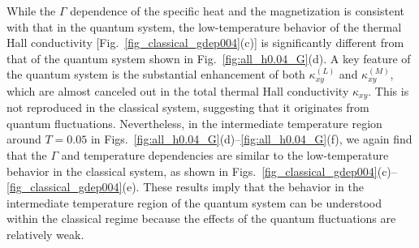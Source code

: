 \documentclass[twocolumn,superscriptaddress,showpacs, longbibliography, aps, prb]{revtex4-2}
\newcommand{\blue}[1]{\textcolor{blue}{#1}}
\newcommand{\orange}[1]{\textcolor{orange}{#1}}
\begin{document}
While the $\Gamma$ dependence of the specific heat and the magnetization is 
consistent with that in the quantum system,
the low-temperature behavior of the thermal Hall conductivity [Fig.~\ref{fig_classical_gdep004}(c)] is 
significantly different from that %
of the quantum system shown in Fig.~\ref{fig:all_h0.04_G}(d).
A key feature of %
the quantum system is the substantial enhancement of both $\kappa_{xy}^{(L)}$ and $\kappa_{xy}^{(M)}$, which are almost canceled out in the total thermal Hall conductivity $\kappa_{xy}$.
This is not reproduced in the classical system, suggesting that it %
originates from %
quantum fluctuations.
Nevertheless, in the intermediate temperature region around $T=0.05$ in Figs.~\ref{fig:all_h0.04_G}(d)--\ref{fig:all_h0.04_G}(f), 
we again find that the $\Gamma$ and temperature dependencies are similar to the low-temperature behavior in the classical system, as shown in Figs.~\ref{fig_classical_gdep004}(c)--\ref{fig_classical_gdep004}(e).
These results imply that the behavior in the intermediate temperature region of the quantum system %
can be understood within
the classical regime because the effects of the quantum fluctuations are %
relatively weak.

\end{document}
